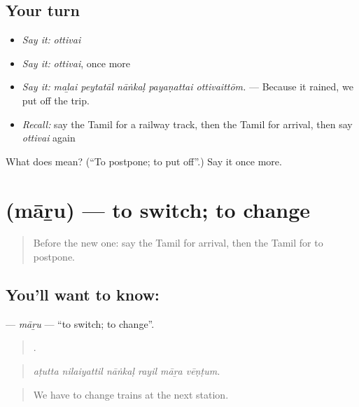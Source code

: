 \subsection*{Your turn}
\begin{itemize}
\raggedright
  \item \emph{Say it:} \emph{ottivai}
  \item \emph{Say it:} \emph{ottivai}, once more
  \item \emph{Say it:} \emph{maḻai peytatāl nāṅkaḷ payaṇattai ottivaittōm.} — Because it rained, we put off the trip.
  \item \emph{Recall:} say the Tamil for a railway track, then the Tamil for arrival, then say \emph{ottivai} again
\end{itemize}

\begin{tcolorbox}[breakable,colback=teal!4,colframe=teal!35!black,title={Before you move on}]
What does  mean? (\textquotedblleft{}To postpone; to put off\textquotedblright{}.) Say it once more.
\end{tcolorbox}
\section[\texorpdfstring{\ta{மாறு} (māṟu)}{மாறு (māṟu)}]{ (māṟu) — to switch; to change}

\label{lesson:TA-C400-maru-change}



\begin{quote}
Before the new one: say the Tamil for arrival, then the Tamil for to postpone.
\end{quote}

\subsection*{You'll want to know: }
\textbf{} — \emph{māṟu} — \textquotedblleft{}to switch; to change\textquotedblright{}.

\begin{quote}
     .
\end{quote}

\begin{quote}
\emph{aṭutta nilaiyattil nāṅkaḷ rayil māṟa vēṇṭum.}
\end{quote}

\begin{quote}
We have to change trains at the next station.
\end{quote}

